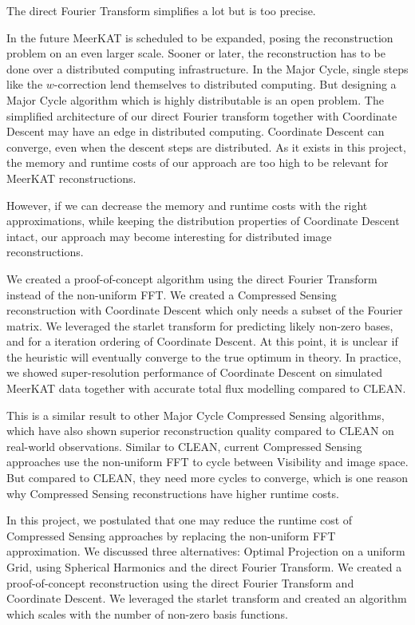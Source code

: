 The direct Fourier Transform simplifies a lot but is too precise. 

In the future MeerKAT is scheduled to be expanded, posing the reconstruction problem on an even larger scale. Sooner or later, the reconstruction has to be done over a distributed computing infrastructure. In the Major Cycle, single steps like the $w$-correction lend themselves to distributed computing. But designing a Major Cycle algorithm which is highly distributable is an open problem. The simplified architecture of our direct Fourier transform together with Coordinate Descent may have an edge in distributed computing. Coordinate Descent can converge, even when the descent steps are distributed. As it exists in this project, the memory and runtime costs of our approach are too high to be relevant for MeerKAT reconstructions. 

However, if we can decrease the memory and runtime costs with the right approximations, while keeping the distribution properties of Coordinate Descent intact, our approach may become interesting for distributed image reconstructions. 







We created a proof-of-concept algorithm using the direct Fourier Transform instead of the non-uniform FFT. We created a Compressed Sensing reconstruction with Coordinate Descent which only needs a subset of the Fourier matrix. We leveraged the starlet transform for predicting likely non-zero bases, and for a iteration ordering of Coordinate Descent. At this point, it is unclear if the heuristic will eventually converge to the true optimum in theory. In practice, we showed super-resolution performance of Coordinate Descent on simulated MeerKAT data together with accurate total flux modelling compared to CLEAN.

This is a similar result to other Major Cycle Compressed Sensing algorithms, which have also shown superior reconstruction quality compared to CLEAN on real-world observations\cite{dabbech2018cygnus}\cite{girard2015sparse}. Similar to CLEAN, current Compressed Sensing approaches use the non-uniform FFT to cycle between Visibility and image space. But compared to CLEAN, they need more cycles to converge, which is one reason why Compressed Sensing reconstructions have higher runtime costs. 

In this project, we postulated that one may reduce the runtime cost of Compressed Sensing approaches by replacing the non-uniform FFT approximation. We discussed three alternatives: Optimal Projection on a uniform Grid, using Spherical Harmonics and the direct Fourier Transform. We created a proof-of-concept reconstruction using the direct Fourier Transform and Coordinate Descent. We leveraged the starlet transform and created an algorithm which scales with the number of non-zero basis functions. 

